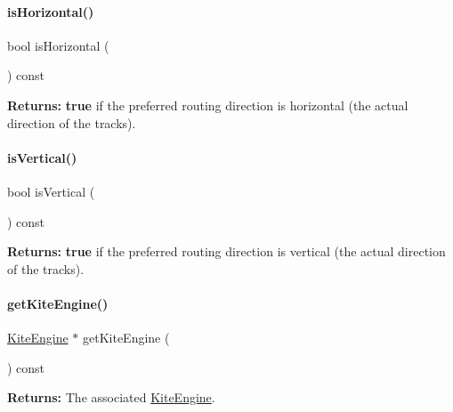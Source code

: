 \paragraph{\texorpdfstring{is\+Horizontal()}{isHorizontal()}}
{\footnotesize\ttfamily bool is\+Horizontal (\begin{DoxyParamCaption}{ }\end{DoxyParamCaption}) const\hspace{0.3cm}{\ttfamily [inline]}}

{\bfseries Returns\+:} {\bfseries true} if the preferred routing direction is horizontal (the actual direction of the tracks). \mbox{\label{classKite_1_1RoutingPlane_abd54544ef1710ee4b67cfb021d73446c}} 
\paragraph{\texorpdfstring{is\+Vertical()}{isVertical()}}
{\footnotesize\ttfamily bool is\+Vertical (\begin{DoxyParamCaption}{ }\end{DoxyParamCaption}) const\hspace{0.3cm}{\ttfamily [inline]}}

{\bfseries Returns\+:} {\bfseries true} if the preferred routing direction is vertical (the actual direction of the tracks). \mbox{\label{classKite_1_1RoutingPlane_af7373bd3a4ee8fcf28a316230ed37fc0}} 
\paragraph{\texorpdfstring{get\+Kite\+Engine()}{getKiteEngine()}}
{\footnotesize\ttfamily \hyperlink{classKite_1_1KiteEngine}{Kite\+Engine} $\ast$ get\+Kite\+Engine (\begin{DoxyParamCaption}{ }\end{DoxyParamCaption}) const\hspace{0.3cm}{\ttfamily [inline]}}

{\bfseries Returns\+:} The associated \hyperlink{classKite_1_1KiteEngine}{Kite\+Engine}. 

